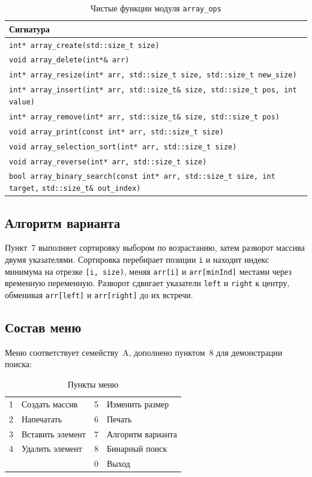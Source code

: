 \begin{table}[htbp]
\centering
\caption{Чистые функции модуля \texttt{array\_ops}}
\begin{tabular}{@{}>{\raggedright\arraybackslash}p{}@{}}
\hline
\textbf{Сигнатура} \\
\hline
\texttt{int* array\_create(std::size\_t size)} \\
\texttt{void array\_delete(int*\& arr)} \\
\texttt{int* array\_resize(int* arr, std::size\_t size, std::size\_t new\_size)} \\
\texttt{int* array\_insert(int* arr, std::size\_t\& size, std::size\_t pos, int value)} \\
\texttt{int* array\_remove(int* arr, std::size\_t\& size, std::size\_t pos)} \\
\texttt{void array\_print(const int* arr, std::size\_t size)} \\
\texttt{void array\_selection\_sort(int* arr, std::size\_t size)} \\
\texttt{void array\_reverse(int* arr, std::size\_t size)} \\
\texttt{bool array\_binary\_search(const int* arr, std::size\_t size, int target,} \texttt{std::size\_t\& out\_index)} \\
\hline
\end{tabular}
\end{table}

\subsection{Алгоритм варианта}

Пункт~7 выполняет сортировку выбором по возрастанию, затем разворот массива
двумя указателями. Сортировка перебирает позиции \texttt{i} и находит индекс
минимума на отрезке \texttt{[i, size)}, меняя \texttt{arr[i]} и
\texttt{arr[minInd]} местами через временную переменную. Разворот сдвигает
указатели \texttt{left} и \texttt{right} к центру, обменивая
\texttt{arr[left]} и \texttt{arr[right]} до их встречи.

\subsection{Состав меню}

Меню соответствует семейству~A, дополнено пунктом~8 для демонстрации поиска:

\begin{table}[htbp]
\centering
\caption{Пункты меню}
\begin{tabular}{@{}r@{\quad}>{\raggedright\arraybackslash}p{4.3cm}@{\qquad}r@{\quad}>{\raggedright\arraybackslash}p{5.2cm}@{}}
\hline
1 & Создать массив & 5 & Изменить размер \\
2 & Напечатать & 6 & Печать \\
3 & Вставить элемент & 7 & Алгоритм варианта \\
4 & Удалить элемент & 8 & Бинарный поиск \\
  & & 0 & Выход \\
\hline
\end{tabular}
\end{table}


